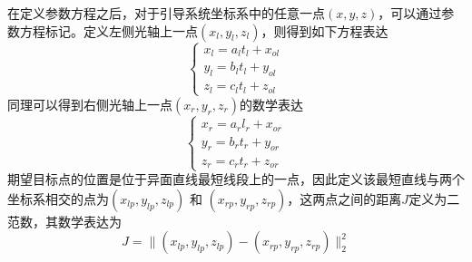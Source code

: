在定义参数方程之后，对于引导系统坐标系中的任意一点$(x,y,z)$，可以通过参数方程标记。定义左侧光轴上一点$(x_l,y_l,z_l)$，则得到如下方程表达
\begin{equation}  
\left\{ 
\begin{array}{lll} 
x_l = a_l t_l + x_{ol} \\
y_l = b_l t_l + y_{ol} \\
z_l = c_l t_l + z_{ol}
\end{array} 
\right.
\end{equation}
同理可以得到右侧光轴上一点$(x_r,y_r,z_r)$的数学表达
\begin{equation}  
\left\{ 
\begin{array}{lll} 
x_r = a_r l_r + x_{or} \\
y_r = b_r t_r + y_{or} \\
z_r = c_r t_r + z_{or}
\end{array} 
\right.
\end{equation}
期望目标点的位置是位于异面直线最短线段上的一点，因此定义该最短直线与两个坐标系相交的点为$(x_{lp}, y_{lp}, z_{lp})$ 和 $(x_{rp}, y_{rp}, z_{rp})$，这两点之间的距离$J$定义为二范数，其数学表达为
\begin{equation}
J = \|(x_{lp}, y_{lp}, z_{lp}) - (x_{rp}, y_{rp}, z_{rp}) \|_2^2
\end{equation}



